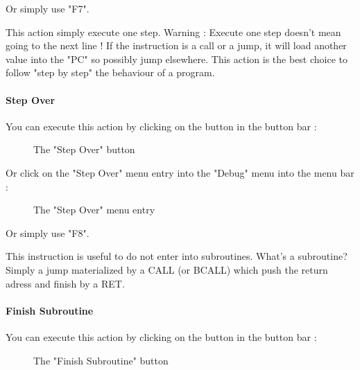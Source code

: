 \documentclass[10pt]{report}
\begin{document}
Or simply use "F7".\newline\newline

This action simply execute one step.\newline
Warning : Execute one step doesn't mean going to the next line !\newline
If the instruction is a call or a jump, it will load another value into the "PC" so possibly jump elsewhere.\newline
This action is the best choice to follow "step by step" the behaviour of a program.\newline

\paragraph{Step Over}

You can execute this action by clicking on the button in the button bar :\newline
\begin{figure}[H]
\centering
{}
\caption{The "Step Over" button} 
\end{figure}

Or click on the "Step Over" menu entry into the "Debug" menu into the menu bar :\newline
\begin{figure}[H]
\centering
{}
\caption{The "Step Over" menu entry} 
\end{figure}

Or simply use "F8".\newline\newline

This instruction is useful to do not enter into subroutines.\newline
What's a subroutine?\newline
Simply a jump materialized by a CALL (or BCALL) which push the return adress and finish by a RET.\newline

\paragraph{Finish Subroutine}

You can execute this action by clicking on the button in the button bar :\newline
\begin{figure}[H]
\centering
{}
\caption{The "Finish Subroutine" button} 
\end{figure}
\end{document}
